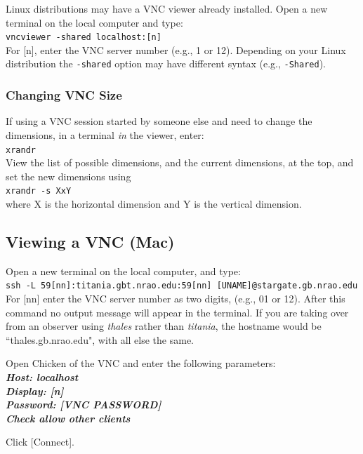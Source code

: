 \documentclass[11pt, reqno, tbtags]{article}
\begin{document}
\noindent Linux distributions may have a VNC viewer already installed. Open a new terminal on the local computer and type: \\
\indent \texttt{vncviewer -shared localhost:[n]} \\
For [n], enter the VNC server number (e.g., 1 or 12). Depending on your Linux distribution the \texttt{-shared} option may have different syntax (e.g., \texttt{-Shared}).

\subsubsection{Changing VNC Size} \label{sssec:vnc}  %
\noindent If using a VNC session started by someone else and need to change the dimensions, in a terminal \textit{in} the viewer, enter: \\
\indent\texttt{xrandr} \\
View the list of possible dimensions, and the current dimensions, at the top, and set the new dimensions using \\
\indent\texttt{xrandr -s XxY} \\
where X is the horizontal dimension and Y is the vertical dimension.

\subsection{Viewing a VNC (Mac)}\label{ssec:vncm}  %
Open a new terminal on the local computer, and type: \\
\indent\texttt{ssh -L 59[nn]:titania.gbt.nrao.edu:59[nn] [UNAME]@stargate.gb.nrao.edu} \\            
For [nn] enter the VNC server number as two digits, (e.g., 01 or 12). After this command no output message will appear in the terminal.  If you are taking over from an observer using \textit{thales} rather than \textit{titania}, the hostname would be ``thales.gb.nrao.edu", with all else the same.    

\noindent Open Chicken of the VNC and enter the following parameters: \\
\indent\textbf{\textit{Host: localhost \\
\indent Display: [n] \\
\indent Password: [VNC PASSWORD] \\
\indent Check allow other clients }}

\noindent Click [Connect].
\end{document}
